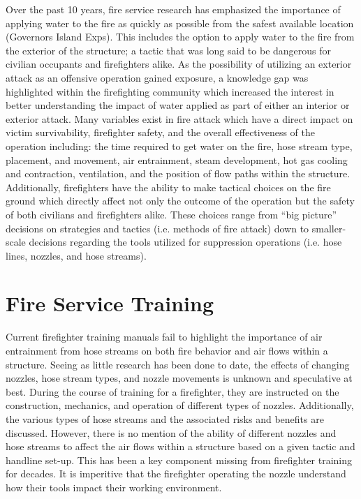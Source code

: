 \documentclass[12pt,oneside]{book}
\begin{document}
Over the past 10 years, fire service research has emphasized the importance of applying water to the fire as quickly as possible from the safest available location (Governors Island Exps). This includes the option to apply water to the fire from the exterior of the structure; a tactic that was long said to be dangerous for civilian occupants and firefighters alike. As the possibility of utilizing an exterior attack as an offensive operation gained exposure, a knowledge gap was highlighted within the firefighting community which increased the interest in better understanding the impact of water applied as part of either an interior or exterior attack. Many variables exist in fire attack which have a direct impact on victim survivability, firefighter safety, and the overall effectiveness of the operation including: the time required to get water on the fire, hose stream type, placement, and movement, air entrainment, steam development, hot gas cooling and contraction, ventilation, and the position of flow paths within the structure. Additionally, firefighters have the ability to make tactical choices on the fire ground which directly affect not only the outcome of the operation but the safety of both civilians and firefighters alike. These choices range from ``big picture'' decisions on strategies and tactics (i.e. methods of fire attack) down to smaller-scale decisions regarding the tools utilized for suppression operations (i.e. hose lines, nozzles, and hose streams). 

\section*{Fire Service Training}

Current firefighter training manuals fail to highlight the importance of air entrainment from hose streams on both fire behavior and air flows within a structure. Seeing as little research has been done to date, the effects of changing nozzles, hose stream types, and nozzle movements is unknown and speculative at best. During the course of training for a firefighter, they are instructed on the construction, mechanics, and operation of different types of nozzles. Additionally, the various types of hose streams and the associated risks and benefits are discussed. However, there is no mention of the ability of different nozzles and hose streams to affect the air flows within a structure based on a given tactic and handline set-up. This has been a key component missing from firefighter training for decades. It is imperitive that the firefighter operating the nozzle understand how their tools impact their working environment. 
\end{document}
